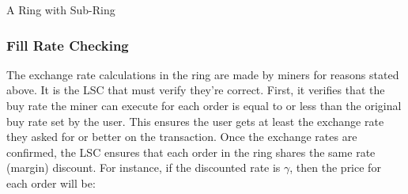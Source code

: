 \documentclass[UTF8,nofonts]{article}
\makeatletter
\newenvironment{figurehere}
 {\def\@captype{figure}}
 {}
\makeatother
\begin{document}
\begin{multicols}{2}
\begin{center}
\begin{figurehere}

\caption{A Ring with Sub-Ring}
\label{fig:ring}
\end{figurehere}
\end{center}

\subsubsection{Fill Rate Checking\label{sec:fill_rate_check}}
The exchange rate calculations in the ring are made by miners for reasons stated above. It is the LSC that must verify they're correct. First, it verifies that the buy rate the miner can execute for each order is equal to or less than the original buy rate set by the user. This ensures the user gets at least the exchange rate they asked for or better on the transaction. Once the exchange rates are confirmed, the LSC ensures that each order in the ring shares the same rate (margin) discount. For instance, if the discounted rate is $\gamma$, then the price for each order will be:


\end{multicols}
\end{document}
